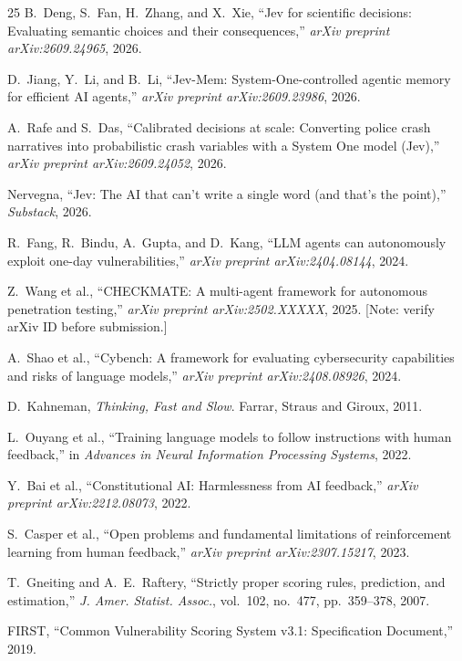 \documentclass[conference]{IEEEtran}
\begin{document}
\begin{thebibliography}{25}
B.~Deng, S.~Fan, H.~Zhang, and X.~Xie, ``Jev for scientific decisions: Evaluating semantic choices and their consequences,'' \emph{arXiv preprint arXiv:2609.24965}, 2026.

D.~Jiang, Y.~Li, and B.~Li, ``Jev-Mem: System-One-controlled agentic memory for efficient AI agents,'' \emph{arXiv preprint arXiv:2609.23986}, 2026.

A.~Rafe and S.~Das, ``Calibrated decisions at scale: Converting police crash narratives into probabilistic crash variables with a System One model (Jev),'' \emph{arXiv preprint arXiv:2609.24052}, 2026.

Nervegna, ``Jev: The AI that can't write a single word (and that's the point),'' \emph{Substack}, 2026.

R.~Fang, R.~Bindu, A.~Gupta, and D.~Kang, ``LLM agents can autonomously exploit one-day vulnerabilities,'' \emph{arXiv preprint arXiv:2404.08144}, 2024.

Z.~Wang et al., ``CHECKMATE: A multi-agent framework for autonomous penetration testing,'' \emph{arXiv preprint arXiv:2502.XXXXX}, 2025. [Note: verify arXiv ID before submission.]

A.~Shao et al., ``Cybench: A framework for evaluating cybersecurity capabilities and risks of language models,'' \emph{arXiv preprint arXiv:2408.08926}, 2024.

D.~Kahneman, \emph{Thinking, Fast and Slow}. Farrar, Straus and Giroux, 2011.

L.~Ouyang et al., ``Training language models to follow instructions with human feedback,'' in \emph{Advances in Neural Information Processing Systems}, 2022.

Y.~Bai et al., ``Constitutional AI: Harmlessness from AI feedback,'' \emph{arXiv preprint arXiv:2212.08073}, 2022.

S.~Casper et al., ``Open problems and fundamental limitations of reinforcement learning from human feedback,'' \emph{arXiv preprint arXiv:2307.15217}, 2023.

T.~Gneiting and A.~E.~Raftery, ``Strictly proper scoring rules, prediction, and estimation,'' \emph{J. Amer. Statist. Assoc.}, vol.~102, no.~477, pp.~359--378, 2007.

FIRST, ``Common Vulnerability Scoring System v3.1: Specification Document,'' 2019.

\end{thebibliography}
\end{document}
